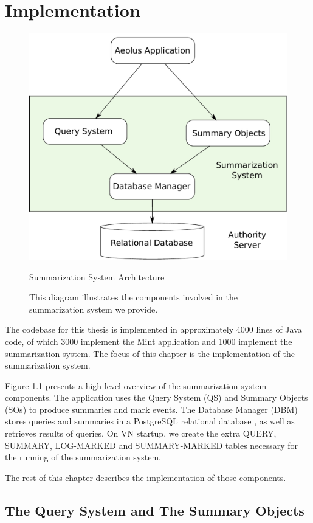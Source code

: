 \chapter{Implementation}

\begin{figure}[h]
\centering
\includegraphics[width=.8\textwidth,keepaspectratio]{figures/impl-sysarch}
\caption*{Summarization System Architecture}
\caption[Summarization System Architecture]{This diagram illustrates the components involved in the summarization system we provide.}
\label{fig:impl-sysarch}
\end{figure}

The codebase for this thesis is implemented in approximately 4000 lines of Java code, of which 3000 implement the Mint application and 1000 implement the summarization system. The focus of this chapter is the implementation of the summarization system.

Figure \ref{fig:impl-sysarch} presents a high-level overview of the summarization system components. The application uses the Query System (QS) and Summary Objects (SOs) to produce summaries and mark events. The Database Manager (DBM) stores queries and summaries in a PostgreSQL relational database \cite{pgsql-gen}, as well as retrieves results of queries. On VN startup, we create the extra QUERY, SUMMARY, LOG-MARKED and SUMMARY-MARKED tables necessary for the running of the summarization system.

The rest of this chapter describes the implementation of those components.

\section{The Query System and The Summary Objects}


